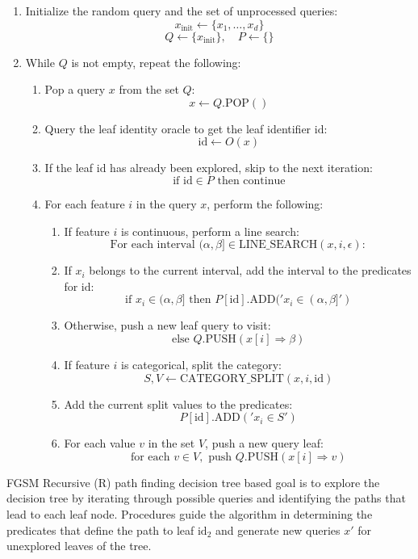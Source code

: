 \begin{enumerate}
        \item Initialize the random query and the set of unprocessed queries:
        \[
        x_{\text{init}} \leftarrow \{x_1, \ldots, x_d\}
        \]
        \[
        Q \leftarrow \{x_{\text{init}}\}, \quad P \leftarrow \{\}
        \]
        \item While $Q$ is not empty, repeat the following:
        \begin{enumerate}
            \item Pop a query $x$ from the set $Q$:
            \[
            x \leftarrow Q.\text{POP}()
            \]
            \item Query the leaf identity oracle to get the leaf identifier $\text{id}$:
            \[
            \text{id} \leftarrow O(x)
            \]
            \item If the leaf $\text{id}$ has already been explored, skip to the next iteration:
            \[
            \text{if } \text{id} \in P \text{ then continue}
            \]
            \item For each feature $i$ in the query $x$, perform the following:
            \begin{enumerate}
                \item If feature $i$ is continuous, perform a line search:
                \[
                \text{For each interval } (\alpha, \beta] \in \text{LINE\_SEARCH}(x, i, \epsilon):
                \]
                \item If $x_i$ belongs to the current interval, add the interval to the predicates for $\text{id}$:
                \[
                \text{if } x_i \in (\alpha, \beta] \text{ then } P[\text{id}].\text{ADD}('x_i \in (\alpha, \beta]')
                \]
                \item Otherwise, push a new leaf query to visit:
                \[
                \text{else } Q.\text{PUSH}(x[i] \Rightarrow \beta)
                \]
                \item If feature $i$ is categorical, split the category:
                \[
                S, V \leftarrow \text{CATEGORY\_SPLIT}(x, i, \text{id})
                \]
                \item Add the current split values to the predicates:
                \[
                P[\text{id}].\text{ADD}('x_i \in S')
                \]
                \item For each value $v$ in the set $V$, push a new query leaf:
                \[
                \text{for each } v \in V, \text{ push } Q.\text{PUSH}(x[i] \Rightarrow v)
                \]
            \end{enumerate}
        \end{enumerate}
    \end{enumerate}

FGSM Recursive (R) path finding decision tree based goal is to explore the decision tree by iterating through possible queries and identifying the paths that lead to each leaf node. Procedures guide the algorithm in determining the predicates that define the path to leaf $\text{id}_2$ and generate new queries $x'$ for unexplored leaves of the tree.